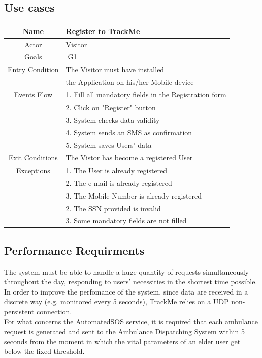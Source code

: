 \documentclass[12pt,a4paper]{article}
\begin{document}
		\subsection{Use cases}
			\begin{center}
				\begin{tabular}{| c | l |}
					\hline
					Name & Register to TrackMe \\
					\hline
					Actor & Visitor \\
					\hline
					Goals & [G1] \\
					\hline
					Entry Condition & The Visitor must have installed \\
				                &	the Application on his/her Mobile device \\ \hline
 					Events Flow  &
 						1. Fill all mandatory fields in the Registration form\\
 						&2. Click on "Register" button\\
 						&3. System checks data validity\\
 						&4. System sends an SMS as confirmation\\
 						&5. System saves Users' data\\
 					  \hline
					Exit Conditions  & The Vistor has become a registered User \\ \hline
					Exceptions & 
					1. The User is already registered\\
					&2. The e-mail is already registered\\
					&3. The Mobile Number is already registered\\
					&2. The SSN provided is invalid\\
					&3. Some mandatory fields are not filled\\
					\hline
				\end{tabular}
			\end{center}
		
	
	\subsection{Performance Requirments}
	The system must be able to handle a huge quantity of requests simultaneously throughout the day, responding to users' necessities in the shortest time possible. In order to improve the perfomance of the system, since data are received in a discrete way (e.g. monitored every 5 seconds), TrackMe relies on a UDP non-persistent connection.\\
	For what concerns the AutomatedSOS service, it is required that each ambulance request is generated and sent to the Ambulance Dispatching System within 5 seconds from the moment in which the vital parameters of an elder user get below the fixed threshold.
	
\end{document}
